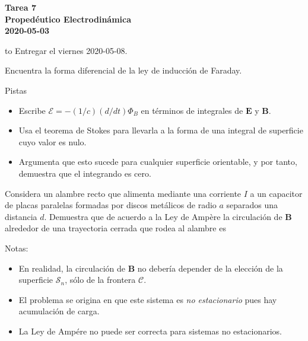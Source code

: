 \documentclass{exam}
\begin{document}
\begin{center}
  \bf\large Tarea 7\\
  Propedéutico Electrodinámica\\
  2020-05-03\\[20pt]
\end{center}
\hbox to \textwidth{Nombre: \enspace\hrulefill}
Entregar el viernes 2020-05-08.

\begin{questions}
\question\label{1} Encuentra la forma diferencial de la ley de inducción de
Faraday.

Pistas
\begin{itemize}
\item Escribe $\mathcal E=-(1/c)(d/dt)\Phi_B$ en términos de
  integrales de $\bm E$ y $\bm B$.
\item Usa el teorema de Stokes para llevarla a la forma de una
  integral de superficie cuyo valor es nulo.
\item Argumenta que esto sucede para cualquier superficie orientable,
  y por tanto, demuestra que el integrando es cero.
\end{itemize}
\question\label{2} Considera un alambre recto que alimenta mediante una
  corriente $I$ a un capacitor de placas paralelas formadas por discos
  metálicos de radio $a$ separados una distancia $d$. Demuestra que de
  acuerdo a la Ley de Ampère la circulación de $\bm B$ alrededor de
  una trayectoria cerrada que rodea al alambre es
  Notas:
  \begin{itemize}
  \item En realidad, la circulación de $\bm B$ no debería depender de
    la elección de la superficie $\mathcal S_n$, sólo de la frontera
    $\mathcal C$.
  \item El problema se origina en que este sistema es {\em no
      estacionario} pues hay acumulación de carga.
  \item La Ley de Ampére no puede ser correcta para sistemas no estacionarios.
  \end{itemize}


\end{questions}
\end{document}
